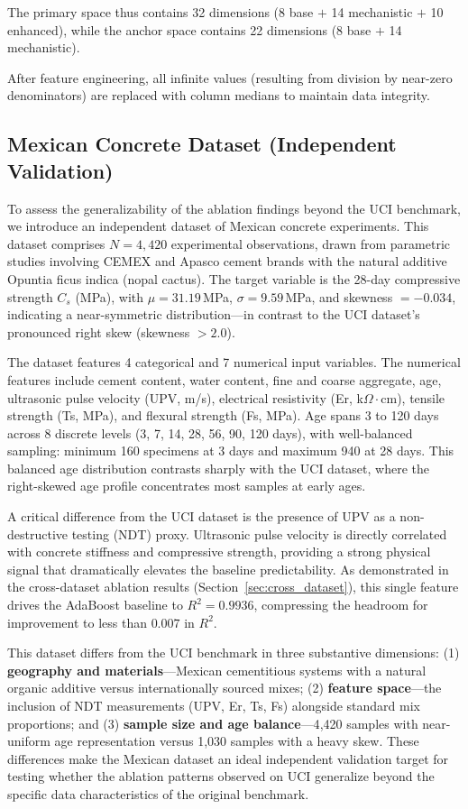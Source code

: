 \documentclass[journal]{IEEEtran}
\begin{document}
The primary space thus contains 32 dimensions (8 base $+$ 14 mechanistic $+$ 10 enhanced), while the anchor space contains 22 dimensions (8 base $+$ 14 mechanistic).

After feature engineering, all infinite values (resulting from division by near-zero denominators) are replaced with column medians to maintain data integrity.

\subsection{Mexican Concrete Dataset (Independent Validation)}

To assess the generalizability of the ablation findings beyond the UCI benchmark, we introduce an independent dataset of Mexican concrete experiments. This dataset comprises $N = 4{,}420$ experimental observations, drawn from parametric studies involving CEMEX and Apasco cement brands with the natural additive Opuntia ficus indica (nopal cactus). The target variable is the 28-day compressive strength $C_s$ (MPa), with $\mu = 31.19$\,MPa, $\sigma = 9.59$\,MPa, and skewness $= -0.034$, indicating a near-symmetric distribution---in contrast to the UCI dataset's pronounced right skew (skewness $>2.0$).

The dataset features 4 categorical and 7 numerical input variables. The numerical features include cement content, water content, fine and coarse aggregate, age, ultrasonic pulse velocity (UPV, m/s), electrical resistivity (Er, k$\Omega\cdot$cm), tensile strength (Ts, MPa), and flexural strength (Fs, MPa). Age spans 3 to 120 days across 8 discrete levels (3, 7, 14, 28, 56, 90, 120 days), with well-balanced sampling: minimum 160 specimens at 3 days and maximum 940 at 28 days. This balanced age distribution contrasts sharply with the UCI dataset, where the right-skewed age profile concentrates most samples at early ages.

A critical difference from the UCI dataset is the presence of UPV as a non-destructive testing (NDT) proxy. Ultrasonic pulse velocity is directly correlated with concrete stiffness and compressive strength, providing a strong physical signal that dramatically elevates the baseline predictability. As demonstrated in the cross-dataset ablation results (Section~\ref{sec:cross_dataset}), this single feature drives the AdaBoost baseline to $R^2 = 0.9936$, compressing the headroom for improvement to less than $0.007$ in $R^2$.

This dataset differs from the UCI benchmark in three substantive dimensions: (1) \textbf{geography and materials}---Mexican cementitious systems with a natural organic additive versus internationally sourced mixes; (2) \textbf{feature space}---the inclusion of NDT measurements (UPV, Er, Ts, Fs) alongside standard mix proportions; and (3) \textbf{sample size and age balance}---4{,}420 samples with near-uniform age representation versus 1{,}030 samples with a heavy skew. These differences make the Mexican dataset an ideal independent validation target for testing whether the ablation patterns observed on UCI generalize beyond the specific data characteristics of the original benchmark.
\end{document}
